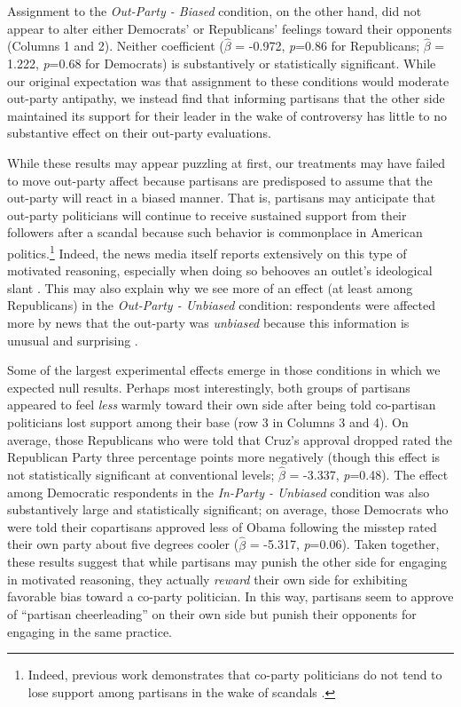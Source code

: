 \documentclass[12pt, letterpaper]{article}
\begin{document}
\bigskip
Assignment to the \textit{Out-Party - Biased} condition, on the other hand, did not appear to alter either Democrats' or Republicans' feelings toward their opponents (Columns 1 and 2). Neither coefficient ($\hat{\beta}$ = -0.972, \textit{p}=0.86 for Republicans; $\hat{\beta}$ = 1.222, \textit{p}=0.68 for Democrats) is substantively or statistically significant. While our original expectation was that assignment to these conditions would moderate out-party antipathy, we instead find that informing partisans that the other side maintained its support for their leader in the wake of controversy has little to no substantive effect on their out-party evaluations. 

While these results may appear puzzling at first, our treatments may have failed to move out-party affect because partisans are predisposed to assume that the out-party will react in a biased manner. That is, partisans may anticipate that out-party politicians will continue to receive sustained support from their followers after a scandal because such behavior is commonplace in American politics.\footnote{Indeed, previous work demonstrates that co-party politicians do not tend to lose support among partisans in the wake of scandals \citep{ahlersood_2014,stoker_1993}.} Indeed, the news media itself reports extensively on this type of motivated reasoning, especially when doing so behooves an outlet's ideological slant \citep{budaketal_2016,puglisisnyder_2011}. This may also explain why we see more of an effect (at least among Republicans) in the \textit{Out-Party - Unbiased} condition: respondents were affected more by news that the out-party was \textit{unbiased} because this information is unusual and surprising \citep[e.g.,][]{maheswaranchaiken_2011}.

Some of the largest experimental effects emerge in those conditions in which we expected null results. Perhaps most interestingly, both groups of partisans appeared to feel \textit{less} warmly toward their own side after being told co-partisan politicians lost support among their base (row 3 in Columns 3 and 4). On average, those Republicans who were told that Cruz's approval dropped rated the Republican Party three percentage points more negatively (though this effect is not statistically significant at conventional levels; $\hat{\beta}$ = -3.337, \textit{p}=0.48). The effect among Democratic respondents in the \textit{In-Party - Unbiased} condition was also substantively large and statistically significant; on average, those Democrats who were told their copartisans approved less of Obama following the misstep rated their own party about five degrees cooler ($\hat{\beta}$ = -5.317, \textit{p}=0.06). Taken together, these results suggest that while partisans may punish the other side for engaging in motivated reasoning, they actually \textit{reward} their own side for exhibiting favorable bias toward a co-party politician. In this way, partisans seem to approve of ``partisan cheerleading'' \citep{bullocketal_2015} on their own side but punish their opponents for engaging in the same practice. 
\end{document}
